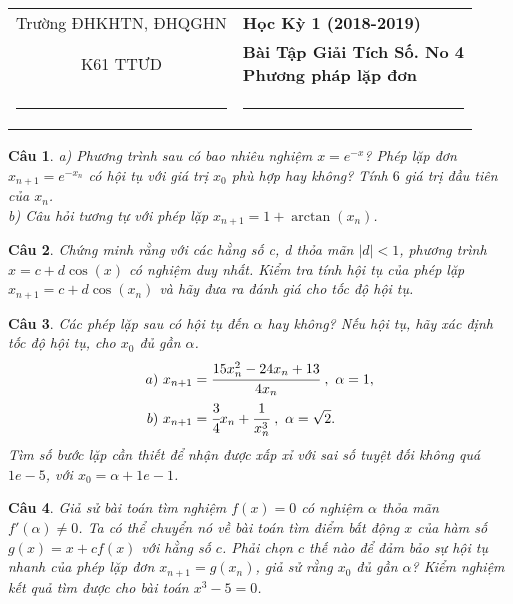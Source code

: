 \documentclass[11pt]{article}
\newtheorem{bt}{Câu}
\begin{document}
\begin{tabular*}
{\linewidth}{c>{\centering\hspace{0pt}} p{}}
Trường ĐHKHTN, ĐHQGHN & {\bf Học Kỳ 1 (2018-2019)}
\tabularnewline
K61 TTƯD & {\bf Bài Tập Giải Tích Số. No 4 \\ Phương pháp lặp đơn}
\tabularnewline
\rule{1in}{1pt}  \small  & \rule{2in}{1pt} %
\tabularnewline

\end{tabular*}
%

\begin{bt} %
a) Phương trình sau có bao nhiêu nghiệm $x=e^{-x}$? Phép lặp đơn $x_{n+1}=e^{-x_n}$ có hội tụ với giá trị $x_0$ phù hợp hay không? Tính $6$ giá trị đầu tiên của $x_n$.\\
b) Câu hỏi tương tự với phép lặp $x_{n+1} = 1 + \arctan(x_n)$.
\end{bt}

\begin{bt} %
Chứng minh rằng với các hằng số c, d thỏa mãn $|d|<1$, phương trình $x=c+d \cos(x)$ có nghiệm duy nhất. Kiểm tra tính hội tụ của phép lặp $x_{n+1}=c+d \cos(x_n)$ và hãy đưa ra đánh giá cho tốc độ hội tụ.
\end{bt}

\begin{bt} %
Các phép lặp sau có hội tụ đến $\alpha$ hay không? Nếu hội tụ, hãy xác định tốc độ hội tụ, cho $x_0$ đủ gần $\alpha$.
%
\begin{align*}
a) \  x_{n+1} &= \cfrac{15 x_n^2-24x_n+13}{4x_n} \ , \ \alpha=1, \\
b) \  x_{n+1} &= \cfrac{3}{4} x_n + \cfrac{1}{x_n^3} \ , \ \alpha=\sqrt{2}.
\end{align*}
%
Tìm số bước lặp cần thiết để nhận được xấp xỉ với sai số tuyệt đối không quá $1e-5$, với $x_0 = \alpha + 1e-1$. 
\end{bt}

\begin{bt} %
Giả sử bài toán tìm nghiệm $f(x)=0$ có nghiệm $\alpha$ thỏa mãn $f'(\alpha)\not=0$. Ta có thể chuyển nó về bài toán tìm điểm bất động $x$ của hàm số $g(x)=x+cf(x)$ với hằng số $c$. Phải chọn $c$ thế nào để đảm bảo sự hội tụ nhanh của phép lặp đơn $x_{n+1}=g(x_n)$, giả sử rằng $x_0$ đủ gần $\alpha$? Kiểm nghiệm kết quả tìm được cho bài toán $x^3-5=0$.
\end{bt}
\end{document}
